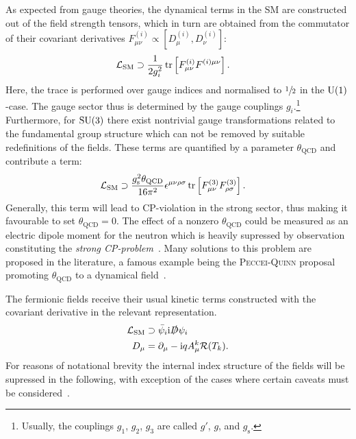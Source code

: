 \noindent As expected from gauge theories, the dynamical terms in the SM are constructed out of the field strength tensors, which in turn are obtained from the commutator of their covariant derivatives \mbox{$F^{(i)}_{\mu\nu}\propto[D^{(i)}_\mu, D^{(i)}_\nu]$}:
\begin{align}
  \mathcal{L}_\text{SM}&\supset\frac1{2g_i^2}\tr\left[F^{(i)}_{\mu\nu}F^{(i)\mu\nu}\right].
\end{align}
Here, the trace is performed over gauge indices and normalised to $\sfrac12$ in the $\mathrm{U}(1)$-case. The gauge sector thus is determined by the gauge couplings $g_i$.\footnote{Usually, the couplings $g_1$, $g_2$, $g_3$ are called $g'$, $g$, and $g_\mathrm{s}$.}
 Furthermore, for $\mathrm{SU}(3)$ there exist nontrivial gauge transformations related to the fundamental group structure which can not be removed by suitable redefinitions of the fields. These terms are quantified by a parameter $\theta_\mathrm{QCD}$ and contribute a term:
\begin{align}
\mathcal{L}_\text{SM}&\supset\frac{g_\mathrm{s}^2\theta_\mathrm{QCD}}{16\pi^2}\epsilon^{\mu\nu\rho\sigma}\tr\left[F^{(3)}_{\mu\nu}F^{(3)}_{\rho\sigma}\right].
\end{align}
Generally, this term will lead to CP-violation in the strong sector, thus making it favourable to set $\theta_\mathrm{QCD}=0$. The effect of a nonzero $\theta_\mathrm{QCD}$ could be measured as an electric dipole moment for the neutron which is heavily supressed by observation constituting the \textit{strong CP-problem}~\cite{arthur, pdg}. Many solutions to this problem are proposed in the literature, a famous example being the \textsc{Peccei-Quinn} proposal promoting $\theta_\mathrm{QCD}$ to a dynamical field~\cite{pq, pq-2}.

\noindent The fermionic fields receive their usual kinetic terms constructed with the covariant derivative in the relevant representation.
\begin{align}
  \mathcal{L}_\text{SM}&\supset\bar{\psi}_i\mathrm{i}\slashed{D}\psi_i\\
  D_\mu&=\partial_\mu-\mathrm{i} qA^k_\mu\mathcal{R}(T_k).
\end{align}
For reasons of notational brevity the internal index structure of the fields will be supressed in the following, with exception of the cases where certain caveats must be considered~\cite{arthur, pdg}.

